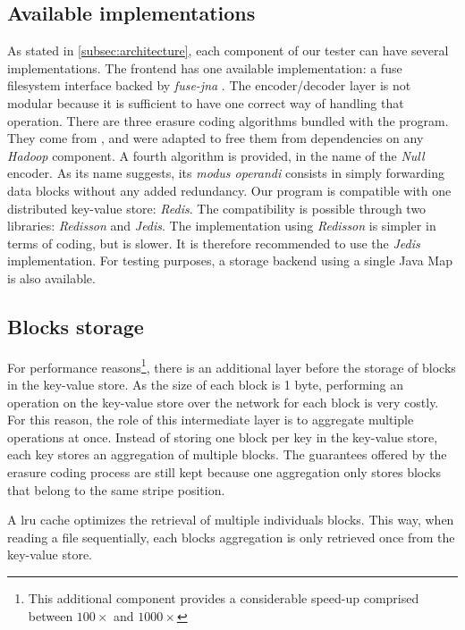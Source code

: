 \subsection{Available implementations}

As stated in \autoref{subsec:architecture}, each component of our tester can have several implementations.
The frontend has one available implementation: a \ac{fuse} filesystem interface backed by \textit{fuse-jna} \autocite{fuse-jna}.
The encoder/decoder layer is not modular because it is sufficient to have one correct way of handling that operation.
There are three erasure coding algorithms bundled with the program.
They come from \autocite{XorbasVLDB}, and were adapted to free them from dependencies on any \textit{Hadoop} component.
A fourth algorithm is provided, in the name of the \textit{Null} encoder.
As its name suggests, its \textit{modus operandi} consists in simply forwarding data blocks without any added redundancy.
Our program is compatible with one distributed key-value store: \textit{Redis}.
The compatibility is possible through two libraries: \textit{Redisson} and \textit{Jedis}.
The implementation using \textit{Redisson} is simpler in terms of coding, but is slower.
It is therefore recommended to use the \textit{Jedis} implementation.
For testing purposes, a storage backend using a single Java Map is also available.

\subsection{Blocks storage}

For performance reasons\footnote{This additional component provides a considerable speed-up comprised between $100\times$ and $1000\times$}, there is an additional layer before the storage of blocks in the key-value store.
As the size of each block is 1 byte, performing an operation on the key-value store over the network for each block is very costly.
For this reason, the role of this intermediate layer is to aggregate multiple operations at once.
Instead of storing one block per key in the key-value store, each key stores an aggregation of multiple blocks.
The guarantees offered by the erasure coding process are still kept because one aggregation only stores blocks that belong to the same stripe position.

A \ac{lru} cache optimizes the retrieval of multiple individuals blocks.
This way, when reading a file sequentially, each blocks aggregation is only retrieved once from the key-value store.

